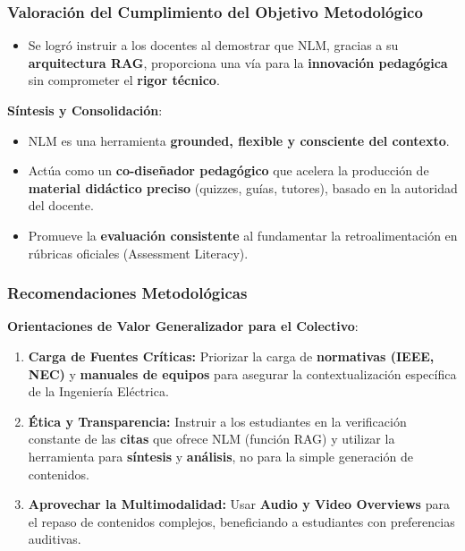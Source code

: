 \documentclass[aspectratio=43]{beamer}
\begin{document}
\begin{frame}
\frametitle{ Valoración del Cumplimiento del Objetivo Metodológico }

\begin{itemize}
    \item Se logró instruir a los docentes al demostrar que NLM, gracias a su \textbf{arquitectura RAG}, proporciona una vía para la \textbf{innovación pedagógica} sin comprometer el \textbf{rigor técnico}.
\end{itemize}

\textbf{Síntesis y Consolidación}:
\begin{itemize}
    \item NLM es una herramienta \textbf{grounded, flexible y consciente del contexto}.
    \item Actúa como un \textbf{co-diseñador pedagógico} que acelera la producción de \textbf{material didáctico preciso} (quizzes, guías, tutores), basado en la autoridad del docente.
    \item Promueve la \textbf{evaluación consistente} al fundamentar la retroalimentación en rúbricas oficiales (Assessment Literacy).
\end{itemize}
\end{frame}

\begin{frame}
\frametitle{ Recomendaciones Metodológicas}

\textbf{Orientaciones de Valor Generalizador para el Colectivo}:
\begin{enumerate}
    \item \textbf{Carga de Fuentes Críticas:} Priorizar la carga de \textbf{normativas (IEEE, NEC)} y \textbf{manuales de equipos} para asegurar la contextualización específica de la Ingeniería Eléctrica.
    \item \textbf{Ética y Transparencia:} Instruir a los estudiantes en la verificación constante de las \textbf{citas} que ofrece NLM (función RAG) y utilizar la herramienta para \textbf{síntesis} y \textbf{análisis}, no para la simple generación de contenidos.
    \item \textbf{Aprovechar la Multimodalidad:} Usar \textbf{Audio y Video Overviews} para el repaso de contenidos complejos, beneficiando a estudiantes con preferencias auditivas.
\end{enumerate}
\end{frame}

\end{document}
